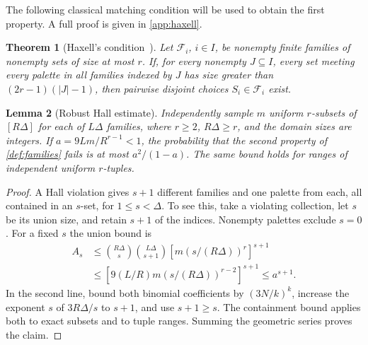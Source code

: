 \documentclass[11pt]{article}
\newtheorem{theorem}{Theorem}[section]
\newtheorem{lemma}[theorem]{Lemma}
\theoremstyle{definition}
\theoremstyle{remark}
\newcommand{\F}{\mathcal F}
\newcommand{\abs}[1]{\left|#1\right|}
\begin{document}
The following classical matching condition will be used to obtain the
first property. A full proof is given in \cref{app:haxell}.
\begin{theorem}[Haxell's condition~\cite{Haxell,Annamalai}]\label{lem:haxell}
Let $\F_i$, $i\in I$, be nonempty finite families of nonempty sets of
size at most $r$. If, for every nonempty $J\subseteq I$, every set
meeting every palette in all families indexed by $J$ has size greater
than $(2r-1)(\abs J-1)$, then pairwise disjoint choices
$S_i\in\F_i$ exist.
\end{theorem}

\begin{lemma}[Robust Hall estimate]\label{lem:hallbound}
Independently sample $m$ uniform $r$-subsets of $[R\Delta]$ for each of
$L\Delta$ families, where $r\ge2$, $R\Delta\ge r$, and the domain sizes are integers.
If $a=9Lm/R^{r-1}<1$, the probability that the second property of
\cref{def:families} fails is at most $a^2/(1-a)$.
The same bound holds for ranges of independent uniform $r$-tuples.
\end{lemma}
\begin{proof}
A Hall violation gives $s+1$ different families and one palette from
each, all contained in an $s$-set, for $1\le s<\Delta$. To see this,
take a violating collection, let $s$ be its union size, and retain
$s+1$ of the indices. Nonempty palettes exclude $s=0$.
For a fixed $s$ the union bound is
\begin{align*}
 A_s&\le\binom{R\Delta}s\binom{L\Delta}{s+1}
          [m(s/(R\Delta))^r]^{s+1}\\
 &\le\left[9(L/R)m\left(s/(R\Delta)\right)^{r-2}\right]^{s+1}
 \le a^{s+1}.
\end{align*}
In the second line, bound both binomial coefficients by $(3N/k)^k$,
increase the exponent $s$ of $3R\Delta/s$ to $s+1$, and use
$s+1\ge s$. The containment bound applies both to exact subsets and to
tuple ranges. Summing the geometric series proves the claim.
\end{proof}
\end{document}
